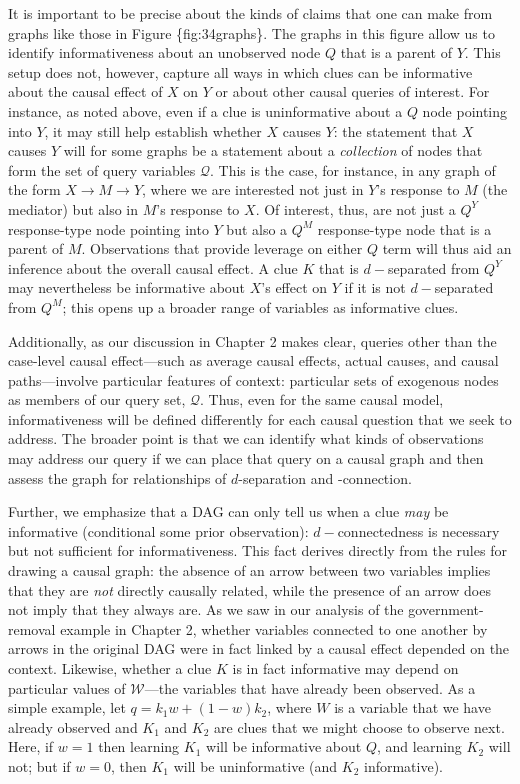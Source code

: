 \documentclass[
  12pt,
]{book}
\begin{document}
It is important to be precise about the kinds of claims that one can make from graphs like those in Figure \{fig:34graphs\}. The graphs in this figure allow us to identify informativeness about an unobserved node \(Q\) that is a parent of \(Y\). This setup does not, however, capture all ways in which clues can be informative about the causal effect of \(X\) on \(Y\) or about other causal queries of interest. For instance, as noted above, even if a clue is uninformative about a \(Q\) node pointing into \(Y\), it may still help establish whether \(X\) causes \(Y\): the statement that \(X\) causes \(Y\) will for some graphs be a statement about a \emph{collection} of nodes that form the set of query variables \(\mathcal Q\). This is the case, for instance, in any graph of the form \(X \rightarrow M \rightarrow Y\), where we are interested not just in \(Y\)'s response to \(M\) (the mediator) but also in \(M\)'s response to \(X\). Of interest, thus, are not just a \(Q^Y\) response-type node pointing into \(Y\) but also a \(Q^M\) response-type node that is a parent of \(M\). Observations that provide leverage on either \(Q\) term will thus aid an inference about the overall causal effect. A clue \(K\) that is \(d-\)separated from \(Q^Y\) may nevertheless be informative about \(X\)'s effect on \(Y\) if it is not \(d-\)separated from \(Q^M\); this opens up a broader range of variables as informative clues.

Additionally, as our discussion in Chapter 2 makes clear, queries other than the case-level causal effect---such as average causal effects, actual causes, and causal paths---involve particular features of context: particular sets of exogenous nodes as members of our query set, \(\mathcal Q\). Thus, even for the same causal model, informativeness will be defined differently for each causal question that we seek to address. The broader point is that we can identify what kinds of observations may address our query if we can place that query on a causal graph and then assess the graph for relationships of \(d\)-separation and -connection.

Further, we emphasize that a DAG can only tell us when a clue \emph{may} be informative (conditional some prior observation): \(d-\)connectedness is necessary but not sufficient for informativeness. This fact derives directly from the rules for drawing a causal graph: the absence of an arrow between two variables implies that they are \emph{not} directly causally related, while the presence of an arrow does not imply that they always are. As we saw in our analysis of the government-removal example in Chapter 2, whether variables connected to one another by arrows in the original DAG were in fact linked by a causal effect depended on the context. Likewise, whether a clue \(K\) is in fact informative may depend on particular values of \(\mathcal W\)---the variables that have already been observed. As a simple example, let \(q = k_1w + (1-w)k_2\), where \(W\) is a variable that we have already observed and \(K_1\) and \(K_2\) are clues that we might choose to observe next. Here, if \(w=1\) then learning \(K_1\) will be informative about \(Q\), and learning \(K_2\) will not; but if \(w=0\), then \(K_1\) will be uninformative (and \(K_2\) informative).
\end{document}
